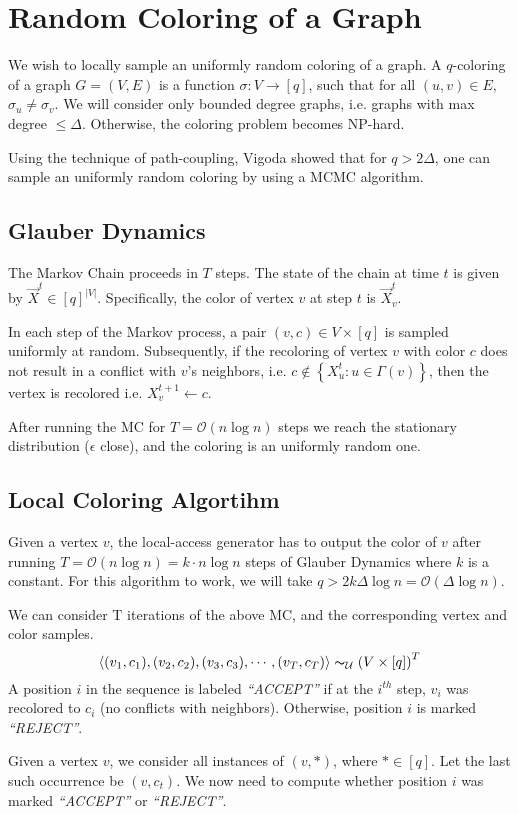 \section{Random Coloring of a Graph}%
\label{sec:random_coloring_of_a_graph}

We wish to locally sample an uniformly random coloring of a graph.
A $q$-coloring of a graph $G = (V, E)$ is a function $\sigma : V\rightarrow [q]$,
such that for all $(u,v)\in E$, $\sigma_u \not= \sigma_v$.
We will consider only bounded degree graphs, i.e. graphs with max degree $\le \Delta$.
Otherwise, the coloring problem becomes NP-hard.

Using the technique of path-coupling, Vigoda  showed that for $q > 2\Delta$,
one can sample an uniformly random coloring by using a MCMC algorithm.

\subsection{Glauber Dynamics}%
\label{sub:glauber_dynamics}

The Markov Chain proceeds in $T$ steps. The state of the chain at time $t$ is given by $\vec X^t\in [q]^{|V|}$.
Specifically, the color of vertex $v$ at step $t$ is $\vec X^t_v$.

In each step of the Markov process, a pair $(v, c)\in V\times [q]$ is sampled uniformly at random.
Subsequently, if the recoloring of vertex $v$ with color $c$ does not result in a conflict with $v$'s neighbors,
i.e. $c\not\in \left\{ X^t_u : u\in \Gamma(v)\right\}$, then the vertex is recolored i.e. $X_v^{t+1}\leftarrow c$.

After running the MC for $T = \mathcal{O}(n\log n)$ steps we reach the stationary distribution ($\epsilon$ close),
and the coloring is an uniformly random one.

\subsection{Local Coloring Algortihm}%
\label{sub:local_coloring_algortihm}

Given a vertex $v$, the local-access generator has to output the color of $v$
after running $T = \mathcal{O}(n\log n) = k\cdot n\log n$ steps of Glauber Dynamics where $k$ is a constant.
For this algorithm to work, we will take $q > 2k\Delta\log n = \mathcal{O}(\Delta\log n)$.

We can consider T iterations of the above MC, and the corresponding vertex and color samples.
\[
\left\langle (v_1, c_1), (v_2, c_2), (v_3, c_3), \cdots, (v_T, c_T)\right\rangle \thicksim_{\mathcal U} \left( V\times [q]\right)^T
\]
A position $i$ in the sequence is labeled \emph{``ACCEPT''} if at the $i^{th}$ step,
$v_i$ was recolored to $c_i$ (no conflicts with neighbors).
Otherwise, position $i$ is marked \emph{``REJECT''}.

Given a vertex $v$, we consider all instances of $(v, *)$, where $*\in [q]$.
Let the last such occurrence be $(v, c_t)$.
We now need to compute whether position $i$ was marked \emph{``ACCEPT''} or \emph{``REJECT''}.


